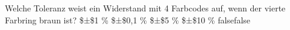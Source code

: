     {Welche Toleranz weist ein Widerstand mit 4 Farbcodes auf, wenn der vierte Farbring braun ist?}
    {\$±\$1 \%}
    {\$±\$0,1 \%}
    {\$±\$5 \%}
    {\$±\$10 \%}
    {false}{false}